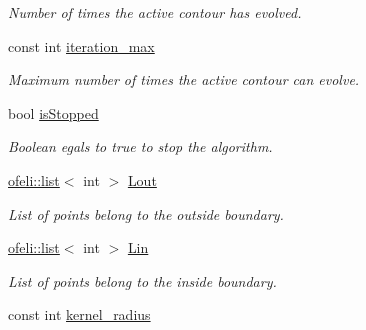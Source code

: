 \begin{DoxyCompactItemize}
\begin{DoxyCompactList}\small\item\em Number of times the active contour has evolved. \end{DoxyCompactList}\item 
\hypertarget{classofeli_1_1_active_contour_a7fd09d653e483695eefea4f0e3225bcf}{const int \hyperlink{classofeli_1_1_active_contour_a7fd09d653e483695eefea4f0e3225bcf}{iteration\-\_\-max}}\label{classofeli_1_1_active_contour_a7fd09d653e483695eefea4f0e3225bcf}

\begin{DoxyCompactList}\small\item\em Maximum number of times the active contour can evolve. \end{DoxyCompactList}\item 
\hypertarget{classofeli_1_1_active_contour_a610cd07a1013f1b50a5ec5a78c847a40}{bool \hyperlink{classofeli_1_1_active_contour_a610cd07a1013f1b50a5ec5a78c847a40}{is\-Stopped}}\label{classofeli_1_1_active_contour_a610cd07a1013f1b50a5ec5a78c847a40}

\begin{DoxyCompactList}\small\item\em Boolean egals to {\ttfamily true} to stop the algorithm. \end{DoxyCompactList}\item 
\hypertarget{classofeli_1_1_active_contour_a31e0eb18a7ea6ae90acf66ed018fcd85}{\hyperlink{classofeli_1_1list}{ofeli\-::list}$<$ int $>$ \hyperlink{classofeli_1_1_active_contour_a31e0eb18a7ea6ae90acf66ed018fcd85}{Lout}}\label{classofeli_1_1_active_contour_a31e0eb18a7ea6ae90acf66ed018fcd85}

\begin{DoxyCompactList}\small\item\em List of points belong to the outside boundary. \end{DoxyCompactList}\item 
\hypertarget{classofeli_1_1_active_contour_a7662d4f5c8b87d3e642b08b7e341bd79}{\hyperlink{classofeli_1_1list}{ofeli\-::list}$<$ int $>$ \hyperlink{classofeli_1_1_active_contour_a7662d4f5c8b87d3e642b08b7e341bd79}{Lin}}\label{classofeli_1_1_active_contour_a7662d4f5c8b87d3e642b08b7e341bd79}

\begin{DoxyCompactList}\small\item\em List of points belong to the inside boundary. \end{DoxyCompactList}\item 
\hypertarget{classofeli_1_1_active_contour_a00740d5331e8d4f60c1345cc8cabf7ad}{const int \hyperlink{classofeli_1_1_active_contour_a00740d5331e8d4f60c1345cc8cabf7ad}{kernel\-\_\-radius}}\label{classofeli_1_1_active_contour_a00740d5331e8d4f60c1345cc8cabf7ad}


\end{DoxyCompactItemize}
